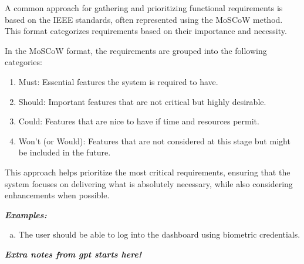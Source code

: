 \documentclass[a4paper]{article}
\begin{document}
A common approach for gathering and prioritizing functional requirements is based on the IEEE standards, often represented using 
the MoSCoW method. This format categorizes requirements based on their importance and necessity.

In the MoSCoW format, the requirements are grouped into the following categories:

\begin{enumerate}
    \item Must: Essential features the system is required to have. 
    \item Should: Important features that are not critical but highly desirable. 
    \item Could: Features that are nice to have if time and resources permit. 
    \item Won't (or Would): Features that are not considered at this stage but might be included in the future. 
\end{enumerate}

This approach helps prioritize the most critical requirements, ensuring that the system focuses on delivering what is absolutely necessary, 
while also considering enhancements when possible.

\textbf{\textit{Examples:}} 
    \begin{enumerate}[(a)]
        \item The user should be able to log into the dashboard using biometric credentials.  
    \end{enumerate}
\vspace{0.5 cm}

\textbf{\textit{Extra notes from gpt starts here! }}
\end{document}
